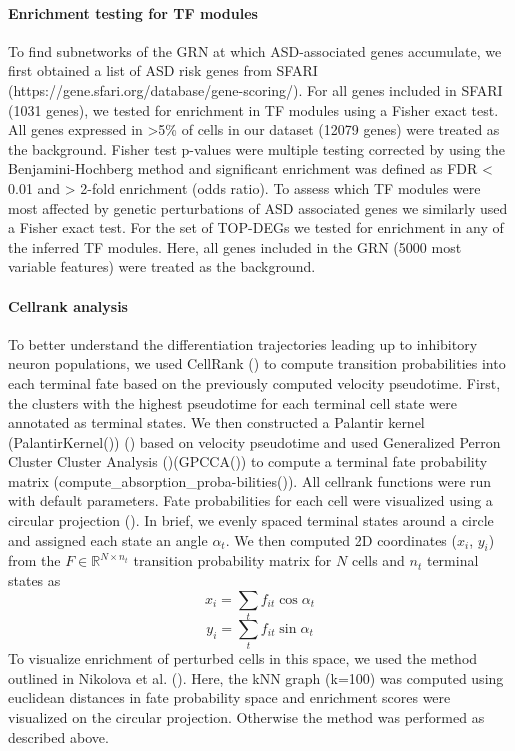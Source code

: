\paragraph{Enrichment testing for TF modules}
To find subnetworks of the GRN at which ASD-associated genes accumulate, we first obtained a list of ASD risk genes from SFARI \\(https://gene.sfari.org/database/gene-scoring/). For all genes included in SFARI (1031 genes), we tested for enrichment in TF modules using a Fisher exact test. All genes expressed in >5\% of cells in our dataset (12079 genes) were treated as the background. Fisher test p-values were multiple testing corrected by using the Benjamini-Hochberg method and significant enrichment was defined as FDR < 0.01 and > 2-fold enrichment (odds ratio). To assess which TF modules were most affected by genetic perturbations of ASD associated genes we similarly used a Fisher exact test. For the set of TOP-DEGs we tested for enrichment in any of the inferred TF modules. Here, all genes included in the GRN (5000 most variable features) were treated as the background.  

\paragraph{Cellrank analysis}
To better understand the differentiation trajectories leading up to inhibitory neuron populations, we used CellRank (\cite{lange_cellrank_2022}) to compute transition probabilities into each terminal fate based on the previously computed velocity pseudotime. First, the clusters with the highest pseudotime for each terminal cell state were annotated as terminal states. We then constructed a Palantir kernel (PalantirKernel()) (\cite{setty_characterization_2019}) based on velocity pseudotime and used Generalized Perron Cluster Cluster Analysis (\cite{reuter_generalized_2018})(GPCCA()) to compute a terminal fate probability matrix (compute\_absorption\_proba-bilities()). All cellrank functions were run with default parameters. Fate probabilities for each cell were visualized using a circular projection (\cite{velten_human_2017}). In brief, we evenly spaced terminal states around a circle and assigned each state an angle $\alpha_t$. We then computed 2D coordinates ($x_i$, $y_i$) from the $F \in \mathbb{R}^{N\times n_t}$  transition probability matrix for $N$ cells and $n_t$  terminal states as 
\[x_i = \sum_t f_{it} \cos \alpha_t\]
\[y_i = \sum_t f_{it} \sin \alpha_t\]
To visualize enrichment of perturbed cells in this space, we used the method outlined in Nikolova et al. (\cite{nikolova_fate_2022}).  Here, the kNN graph (k=100) was computed using euclidean distances in fate probability space and enrichment scores were visualized on the circular projection. Otherwise the method was performed as described above.

